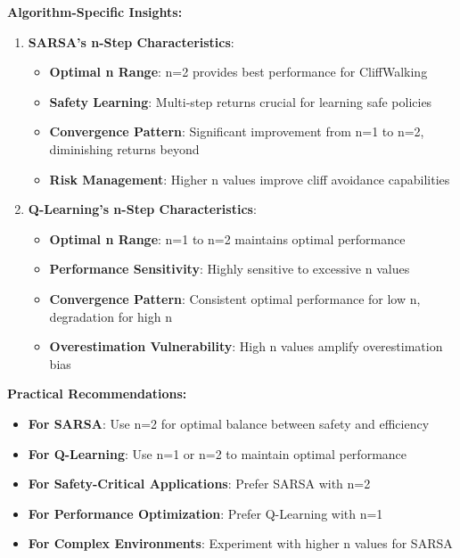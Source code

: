 \documentclass[12pt]{article}
\begin{document}
{{{\textbf{Algorithm-Specific Insights:}

\begin{enumerate}
    \item \textbf{SARSA's n-Step Characteristics}:
    \begin{itemize}
        \item \textbf{Optimal n Range}: n=2 provides best performance for CliffWalking
        \item \textbf{Safety Learning}: Multi-step returns crucial for learning safe policies
        \item \textbf{Convergence Pattern}: Significant improvement from n=1 to n=2, diminishing returns beyond
        \item \textbf{Risk Management}: Higher n values improve cliff avoidance capabilities
    \end{itemize}
    
    \item \textbf{Q-Learning's n-Step Characteristics}:
    \begin{itemize}
        \item \textbf{Optimal n Range}: n=1 to n=2 maintains optimal performance
        \item \textbf{Performance Sensitivity}: Highly sensitive to excessive n values
        \item \textbf{Convergence Pattern}: Consistent optimal performance for low n, degradation for high n
        \item \textbf{Overestimation Vulnerability}: High n values amplify overestimation bias
    \end{itemize}
\end{enumerate}

\textbf{Practical Recommendations:}

\begin{itemize}
    \item \textbf{For SARSA}: Use n=2 for optimal balance between safety and efficiency
    \item \textbf{For Q-Learning}: Use n=1 or n=2 to maintain optimal performance
    \item \textbf{For Safety-Critical Applications}: Prefer SARSA with n=2
    \item \textbf{For Performance Optimization}: Prefer Q-Learning with n=1
    \item \textbf{For Complex Environments}: Experiment with higher n values for SARSA
\end{itemize}

}}}
\end{document}
